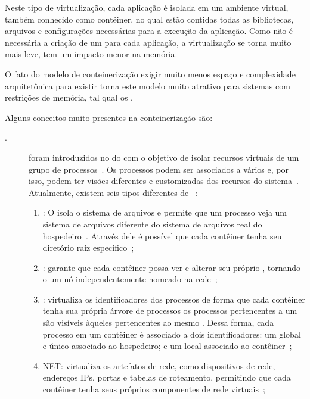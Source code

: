 Neste tipo de virtualização, cada aplicação é isolada em um ambiente virtual, também conhecido como contêiner, no qual estão contidas todas as bibliotecas, arquivos e configurações necessárias para a execução da aplicação. Como não é necessária a criação de um \so para cada aplicação, a virtualização se torna muito mais leve, \ie tem um impacto menor na memória.

O fato do modelo de conteinerização exigir muito menos espaço e complexidade arquitetônica para existir torna este modelo muito atrativo para sistemas com restrições de memória, tal qual os \lws.

Alguns conceitos muito presentes na conteinerização são:
\begin{description}
    \item[\namespace.] \Namespaces foram introduzidos no  do \linux com o objetivo de isolar recursos virtuais de um grupo de processos~\cite{gao2017containerleaks}. Os processos podem ser associados a vários \namespaces e, por isso, podem ter visões diferentes e customizadas dos recursos do sistema~\cite{watada2019emerging}. Atualmente, existem seis tipos diferentes de \namespaces~\cite{watada2019emerging}:
    \begin{enumerate}[label=(\roman*)]
        \item \mount: O \mount \namespace isola o sistema de arquivos e permite que um processo veja um sistema de arquivos diferente do sistema de arquivos real do hospedeiro~\cite{watada2019emerging}. Através dele é possível que cada contêiner tenha seu diretório raiz específico~\cite{dua2014virtualization};
        \item \uts: garante que cada contêiner possa ver e alterar seu próprio \hostname, tornando-o um nó independentemente nomeado na rede~\cite{watada2019emerging, dua2014virtualization};
        \item \pid: virtualiza os identificadores dos processos de forma que cada contêiner tenha sua própria árvore de processos \ie os processos pertencentes a um \namespace são visíveis àqueles pertencentes ao mesmo \namespace. Dessa forma, cada processo em um contêiner é associado a dois identificadores: um global e único associado ao hospedeiro; e um local associado ao contêiner~\cite{watada2019emerging};
        \item NET: virtualiza os artefatos de rede, como dispositivos de rede, endereços IPs, portas e tabelas de roteamento, permitindo que cada contêiner tenha seus próprios componentes de rede virtuais~\cite{watada2019emerging, dua2014virtualization};

\end{enumerate}
\end{description}
